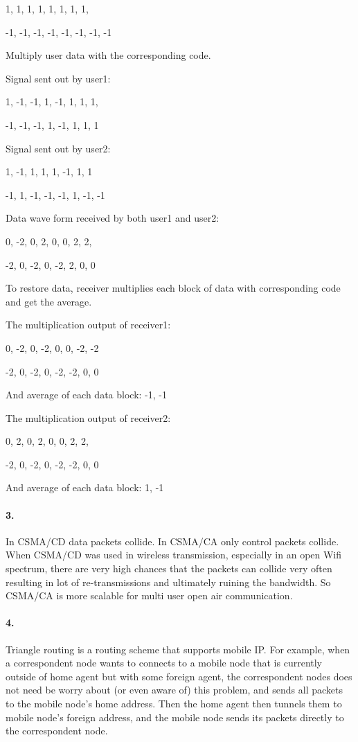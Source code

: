 \documentclass{article}
\begin{document}
 1,  1,  1,  1,  1,  1,  1,  1, 

-1, -1, -1, -1, -1, -1, -1, -1

Multiply user data with the corresponding code.

Signal sent out by user1:

 1, -1, -1,  1, -1,  1,  1,  1,

-1, -1, -1,  1, -1,  1,  1,  1

Signal sent out by user2:

 1, -1,  1,  1,  1, -1,  1,  1

-1,  1, -1, -1, -1,  1, -1, -1

Data wave form received by both user1 and user2:

 0, -2,  0,  2,  0,  0,  2,  2,

-2,  0, -2,  0, -2,  2,  0,  0

To restore data, receiver multiplies each block of data with corresponding code and get the average.

The multiplication output of receiver1:

 0, -2,  0, -2,  0,  0, -2, -2

-2,  0, -2,  0, -2, -2,  0,  0

And average of each data block: -1, -1

The multiplication output of receiver2:

 0,  2,  0,  2,  0,  0,  2,  2,

-2,  0, -2,  0, -2, -2,  0,  0

And average of each data block: 1, -1

\paragraph{3.} In CSMA/CD data packets collide. In CSMA/CA only control packets collide.  When CSMA/CD was used in wireless transmission, especially in an open Wifi spectrum, there are very high chances that the packets can collide very often resulting in lot of re-transmissions and ultimately ruining the bandwidth. So CSMA/CA is more scalable for multi user open air communication.

\paragraph{4.} Triangle routing is a routing scheme that supports mobile IP. For example, when a correspondent node wants to connects to a mobile node that is currently outside of home agent but with some foreign agent, the correspondent nodes does not need be worry about (or even aware of) this problem, and sends all packets to the mobile node's home address. Then the home agent then tunnels them to mobile node's foreign address, and the mobile node sends its packets directly to the correspondent node.
\end{document}
